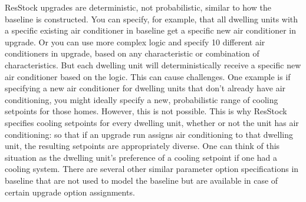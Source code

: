 



ResStock upgrades are deterministic, not probabilistic, similar to how the baseline is constructed. You can specify, for example, that all dwelling units with a specific existing air conditioner in baseline get a specific new air conditioner in upgrade. Or you can use more complex logic and specify 10 different air conditioners in upgrade, based on any characteristic or combination of characteristics. But each dwelling unit will deterministically receive a specific new air conditioner based on the logic. This can cause challenges. One example is if specifying a new air conditioner for dwelling units that don't already have air conditioning, you might ideally specify a new, probabilistic range of cooling setpoints for those homes. However, this is not possible. This is why ResStock specifies cooling setpoints for every dwelling unit, whether or not the unit has air conditioning: so that if an upgrade run assigns air conditioning to that dwelling unit, the resulting setpoints are appropriately diverse. One can think of this situation as the dwelling unit's preference of a cooling setpoint if one had a cooling system. There are several other similar parameter option specifications in baseline that are not used to model the baseline but are available in case of certain upgrade option assignments. 


